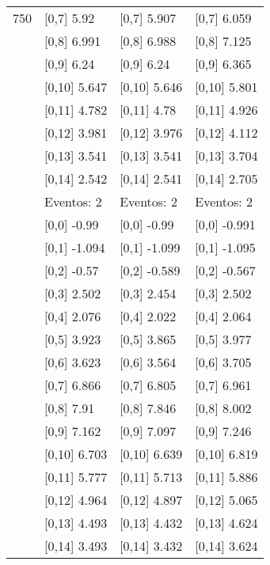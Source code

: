 \begin{table}
\begin{tabular}[t]{llll}
750 & {}[0,7] 5.92 & {}[0,7] 5.907 & {}[0,7] 6.059\\
\addlinespace
 & {}[0,8] 6.991 & {}[0,8] 6.988 & {}[0,8] 7.125\\
 & {}[0,9] 6.24 & {}[0,9] 6.24 & {}[0,9] 6.365\\
 & {}[0,10] 5.647 & {}[0,10] 5.646 & {}[0,10] 5.801\\
 & {}[0,11] 4.782 & {}[0,11] 4.78 & {}[0,11] 4.926\\
 & {}[0,12] 3.981 & {}[0,12] 3.976 & {}[0,12] 4.112\\
\addlinespace
 & {}[0,13] 3.541 & {}[0,13] 3.541 & {}[0,13] 3.704\\
 & {}[0,14] 2.542 & {}[0,14] 2.541 & {}[0,14] 2.705\\
 & Eventos:  2 & Eventos:  2 & Eventos:  2\\
 & {}[0,0] -0.99 & {}[0,0] -0.99 & {}[0,0] -0.991\\
 & {}[0,1] -1.094 & {}[0,1] -1.099 & {}[0,1] -1.095\\
\addlinespace
 & {}[0,2] -0.57 & {}[0,2] -0.589 & {}[0,2] -0.567\\
 & {}[0,3] 2.502 & {}[0,3] 2.454 & {}[0,3] 2.502\\
 & {}[0,4] 2.076 & {}[0,4] 2.022 & {}[0,4] 2.064\\
 & {}[0,5] 3.923 & {}[0,5] 3.865 & {}[0,5] 3.977\\
 & {}[0,6] 3.623 & {}[0,6] 3.564 & {}[0,6] 3.705\\
\addlinespace
1000 & {}[0,7] 6.866 & {}[0,7] 6.805 & {}[0,7] 6.961\\
 & {}[0,8] 7.91 & {}[0,8] 7.846 & {}[0,8] 8.002\\
 & {}[0,9] 7.162 & {}[0,9] 7.097 & {}[0,9] 7.246\\
 & {}[0,10] 6.703 & {}[0,10] 6.639 & {}[0,10] 6.819\\
 & {}[0,11] 5.777 & {}[0,11] 5.713 & {}[0,11] 5.886\\
\addlinespace
 & {}[0,12] 4.964 & {}[0,12] 4.897 & {}[0,12] 5.065\\
 & {}[0,13] 4.493 & {}[0,13] 4.432 & {}[0,13] 4.624\\
 & {}[0,14] 3.493 & {}[0,14] 3.432 & {}[0,14] 3.624\\
\bottomrule
\end{tabular}
\end{table}
